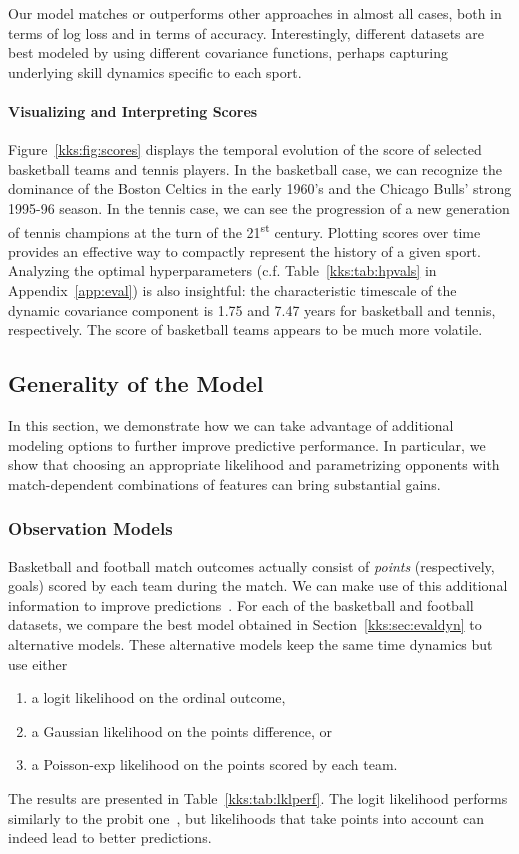 Our model matches or outperforms other approaches in almost all cases, both in terms of log loss and in terms of accuracy.
Interestingly, different datasets are best modeled by using different covariance functions, perhaps capturing underlying skill dynamics specific to each sport.

\paragraph{Visualizing and Interpreting Scores}
Figure~\ref{kks:fig:scores} displays the temporal evolution of the score of selected basketball teams and tennis players.
In the basketball case, we can recognize the dominance of the Boston Celtics in the early 1960's and the Chicago Bulls' strong 1995-96 season.
In the tennis case, we can see the progression of a new generation of tennis champions at the turn of the 21\textsuperscript{st} century.
Plotting scores over time provides an effective way to compactly represent the history of a given sport.
Analyzing the optimal hyperparameters (c.f. Table~\ref{kks:tab:hpvals} in Appendix~\ref{app:eval}) is also insightful: the characteristic timescale of the dynamic covariance component is \num{1.75} and \num{7.47} years for basketball and tennis, respectively.
The score of basketball teams appears to be much more volatile.


\subsection{Generality of the Model}
\label{kks:sec:evalgen}

In this section, we demonstrate how we can take advantage of additional modeling options to further improve predictive performance.
In particular, we show that
choosing an appropriate likelihood and
parametrizing opponents with match-dependent combinations of features
can bring substantial gains.


\subsubsection{Observation Models}
Basketball and football match outcomes actually consist of \emph{points} (respectively, goals) scored by each team during the match.
We can make use of this additional information to improve predictions~\citep{maher1982modelling}.
For each of the basketball and football datasets, we compare the best model obtained in Section~\ref{kks:sec:evaldyn} to alternative models.
These alternative models keep the same time dynamics but use either
\begin{enumerate}
	\item a logit likelihood on the ordinal outcome,
	\item a Gaussian likelihood on the points difference, or
	\item a Poisson-exp likelihood on the points scored by each team.
\end{enumerate}
The results are presented in Table~\ref{kks:tab:lklperf}.
The logit likelihood performs similarly to the probit one~\citep{stern1992all}, but likelihoods that take points into account can indeed lead to better predictions.

